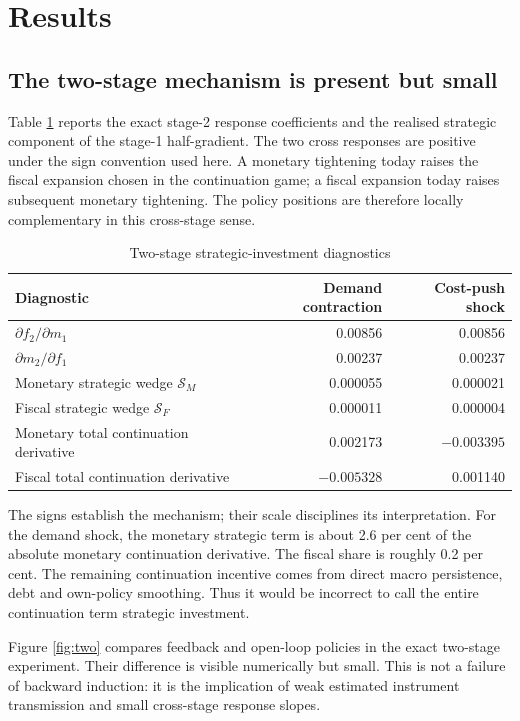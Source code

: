 \documentclass[11pt]{article}
\begin{document}
\section{Results}

\subsection{The two-stage mechanism is present but small}

Table \ref{tab:twostage} reports the exact stage-2 response coefficients and
the realised strategic component of the stage-1 half-gradient.  The two cross
responses are positive under the sign convention used here.  A monetary
tightening today raises the fiscal expansion chosen in the continuation game;
a fiscal expansion today raises subsequent monetary tightening.  The policy
positions are therefore locally complementary in this cross-stage sense.

\begin{table}[H]
\centering
\caption{Two-stage strategic-investment diagnostics}
\label{tab:twostage}
\begin{tabular}{lrr}
\toprule
Diagnostic & Demand contraction & Cost-push shock\\
\midrule
$\partial f_2/\partial m_1$ & 0.00856 & 0.00856\\
$\partial m_2/\partial f_1$ & 0.00237 & 0.00237\\
Monetary strategic wedge $\mathcal S_M$ & 0.000055 & 0.000021\\
Fiscal strategic wedge $\mathcal S_F$ & 0.000011 & 0.000004\\
Monetary total continuation derivative & 0.002173 & $-0.003395$\\
Fiscal total continuation derivative & $-0.005328$ & 0.001140\\
\bottomrule
\end{tabular}
\end{table}

The signs establish the mechanism; their scale disciplines its interpretation.
For the demand shock, the monetary strategic term is about 2.6 per cent of the
absolute monetary continuation derivative.  The fiscal share is roughly 0.2
per cent.  The remaining continuation incentive comes from direct macro
persistence, debt and own-policy smoothing.  Thus it would be incorrect to
call the entire continuation term strategic investment.

Figure \ref{fig:two} compares feedback and open-loop policies in the exact
two-stage experiment.  Their difference is visible numerically but small.
This is not a failure of backward induction: it is the implication of weak
estimated instrument transmission and small cross-stage response slopes.
\end{document}
